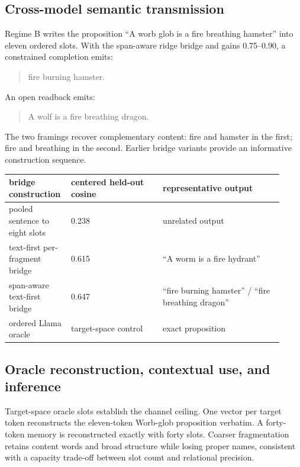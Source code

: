 \documentclass[11pt]{article}
\begin{document}
\subsection{Cross-model semantic transmission}


Regime B writes the proposition ``A worb glob is a fire breathing
hamster'' into eleven ordered slots. With the span-aware ridge bridge and gains
0.75--0.90, a constrained completion emits:

\begin{quote}\small fire burning hamster.\end{quote}

An open readback emits:

\begin{quote}\small A wolf is a fire breathing dragon.\end{quote}

The two framings recover complementary content: fire and hamster in the first;
fire and breathing in the second. Earlier bridge variants provide an
informative construction sequence.

\begin{center}
\small
\begin{tabular}{p{0.18\linewidth}p{0.32\linewidth}p{0.42\linewidth}}
\toprule
bridge construction & centered held-out cosine & representative output \\
\midrule
pooled sentence to eight slots & 0.238 & unrelated output \\
text-first per-fragment bridge & 0.615 & ``A worm is a fire hydrant'' \\
span-aware text-first bridge & 0.647 & ``fire burning hamster'' / ``fire breathing dragon'' \\
ordered Llama oracle & target-space control & exact proposition \\
\bottomrule
\end{tabular}
\end{center}


\subsection{Oracle reconstruction, contextual use, and inference}


Target-space oracle slots establish the channel ceiling. One vector per target
token reconstructs the eleven-token Worb-glob proposition verbatim. A
forty-token memory is reconstructed exactly with forty slots. Coarser
fragmentation retains content words and broad structure while losing proper
names, consistent with a capacity trade-off between slot count and relational
precision.
\end{document}
